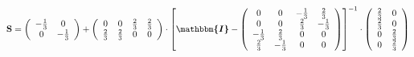 \documentclass[10pt]{article} \usepackage{amsmath} \usepackage{bbold}
\begin{document}
\[ \mathbf{S} = \left(\begin{array}{cc} -\frac{1}{3} & 0 \\ 0 &
-\frac{1}{3} \end{array}\right) + \left(\begin{array}{cccc} 0 & 0 &
\frac{2}{3} & \frac{2}{3} \\ \frac{2}{3} & \frac{2}{3} & 0 & 0
\end{array}\right) \cdot \left[ \boldsymbol{\mathbbm{I}}  -
\left(\begin{array}{cccc} 0 & 0 & -\frac{1}{3} & \frac{2}{3} \\ 0 & 0
& \frac{2}{3} & -\frac{1}{3} \\ -\frac{1}{3} & \frac{2}{3} & 0 & 0 \\
\frac{2}{3} & -\frac{1}{3} & 0 & 0 \end{array}\right) \right]^{-1}
\cdot\left(\begin{array}{cc} \frac{2}{3} & 0 \\ \frac{2}{3} & 0 \\ 0 &
\frac{2}{3} \\ 0 & \frac{2}{3} \end{array}\right) \]
\end{document}
